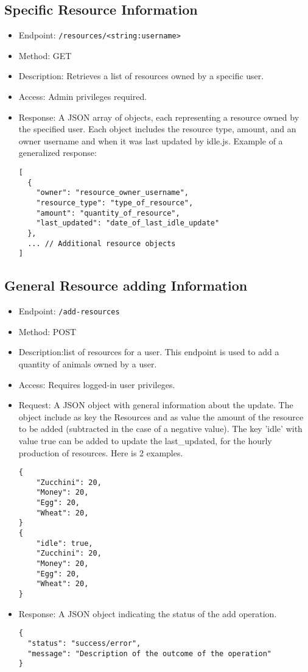 \documentclass[12pt]{article}
\begin{document}
\subsection{Specific Resource Information}
\begin{itemize}
    \item Endpoint: \texttt{/resources/<string:username>}
    \item Method: GET
    \item Description: Retrieves a list of resources owned by a specific user.
    \item Access: Admin privileges required.
    \item Response: A JSON array of objects, each representing a resource owned by the specified user. Each object includes the resource type, amount, and an owner username and when it was last updated by idle.js. Example of a generalized response:
    \begin{verbatim}
[
  {
    "owner": "resource_owner_username",
    "resource_type": "type_of_resource",
    "amount": "quantity_of_resource",
    "last_updated": "date_of_last_idle_update"
  },
  ... // Additional resource objects
]
    \end{verbatim}
\end{itemize}

\subsection{General Resource adding Information}
\begin{itemize}
    \item Endpoint: \texttt{/add-resources}
    \item Method: POST
    \item Description:list of resources for a user. This endpoint is used to add a quantity of animals owned by a user.
    \item Access: Requires logged-in user privileges.
    \item Request: A JSON object with general information about the update.
    The object include as key the Resources and as value the amount of the resource to be added (subtracted in the case of a negative value). The key 'idle' with value true can be added to update the last_updated, for the hourly production of resources. Here is 2 examples.
    \begin{verbatim}
{
    "Zucchini": 20,
    "Money": 20,
    "Egg": 20,
    "Wheat": 20,
}
{
    "idle": true,
    "Zucchini": 20,
    "Money": 20,
    "Egg": 20,
    "Wheat": 20,
}
    \end{verbatim}
    \item Response: A JSON object indicating the status of the add operation.
    \begin{verbatim}
{
  "status": "success/error",
  "message": "Description of the outcome of the operation"
}
    \end{verbatim}
\end{itemize}
\end{document}

